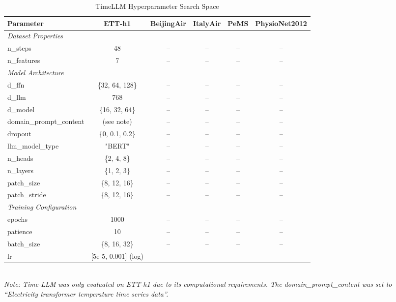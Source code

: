 \begin{table}[H]
\centering
\caption{TimeLLM Hyperparameter Search Space}
\label{tab:hyperparam_timellm}
\begin{adjustbox}{max width=\textwidth}
\begin{small}
\begin{tabular}{l|ccccc}
\toprule
\textbf{Parameter} & \textbf{ETT-h1} & \textbf{BeijingAir} & \textbf{ItalyAir} & \textbf{PeMS} & \textbf{PhysioNet2012} \\
\midrule
\multicolumn{6}{l}{\textit{Dataset Properties}} \\
n\_steps & 48 & -- & -- & -- & -- \\
n\_features & 7 & -- & -- & -- & -- \\
\midrule
\multicolumn{6}{l}{\textit{Model Architecture}} \\
d\_ffn & \{32, 64, 128\} & -- & -- & -- & -- \\
d\_llm & 768 & -- & -- & -- & -- \\
d\_model & \{16, 32, 64\} & -- & -- & -- & -- \\
domain\_prompt\_content & (see note) & -- & -- & -- & -- \\
dropout & \{0, 0.1, 0.2\} & -- & -- & -- & -- \\
llm\_model\_type & "BERT" & -- & -- & -- & -- \\
n\_heads & \{2, 4, 8\} & -- & -- & -- & -- \\
n\_layers & \{1, 2, 3\} & -- & -- & -- & -- \\
patch\_size & \{8, 12, 16\} & -- & -- & -- & -- \\
patch\_stride & \{8, 12, 16\} & -- & -- & -- & -- \\
\midrule
\multicolumn{6}{l}{\textit{Training Configuration}} \\
epochs & 1000 & -- & -- & -- & -- \\
patience & 10 & -- & -- & -- & -- \\
batch\_size & \{8, 16, 32\} & -- & -- & -- & -- \\
lr & [5e-5, 0.001] (log) & -- & -- & -- & -- \\
\bottomrule
\end{tabular}
\end{small}
\end{adjustbox}
\\[2pt]
\footnotesize{\textit{Note: Time-LLM was only evaluated on ETT-h1 due to its computational requirements. The domain\_prompt\_content was set to ``Electricity transformer temperature time series data''.}}
\end{table}